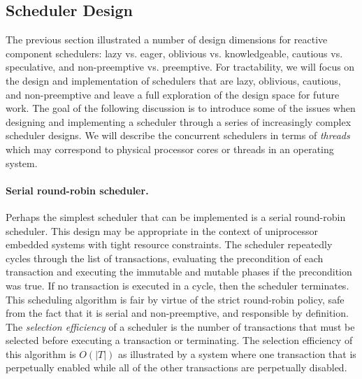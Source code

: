 \subsection{Scheduler Design}

The previous section illustrated a number of design dimensions for reactive component schedulers:  lazy vs. eager, oblivious vs. knowledgeable, cautious vs. speculative, and non-preemptive vs. preemptive.
For tractability, we will focus on the design and implementation of schedulers that are lazy, oblivious, cautious, and non-preemptive and leave a full exploration of the design space for future work.
The goal of the following discussion is to introduce some of the issues when designing and implementing a scheduler through a series of increasingly complex scheduler designs.
We will describe the concurrent schedulers in terms of \emph{threads} which may correspond to physical processor cores or threads in an operating system.


\paragraph{Serial round-robin scheduler.}
Perhaps the simplest scheduler that can be implemented is a serial round-robin scheduler.
This design may be appropriate in the context of uniprocessor embedded systems with tight resource constraints.
The scheduler repeatedly cycles through the list of transactions, evaluating the precondition of each transaction and executing the immutable and mutable phases if the precondition was true.
If no transaction is executed in a cycle, then the scheduler terminates.
This scheduling algorithm is fair by virtue of the strict round-robin policy, safe from the fact that it is serial and non-preemptive, and responsible by definition.
The \emph{selection efficiency} of a scheduler is the number of transactions that must be selected before executing a transaction or terminating.
The selection efficiency of this algorithm is $O(|T|)$ as illustrated by a system where one transaction that is perpetually enabled while all of the other transactions are perpetually disabled.

